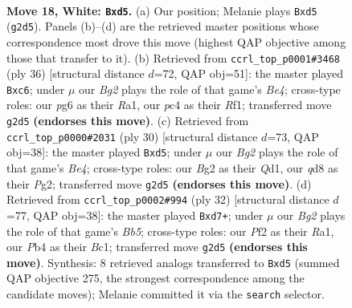 \documentclass[11pt]{article}
\begin{document}
\clearpage

\begin{figure}[p]\centering
\begin{subfigure}{0.46\textwidth}\centering
\resizebox{\linewidth}{!}{%
\newchessgame
\chessboard[
  setfen={rn1qk1r1/p3bp2/b5p1/3n2N1/1Pp5/6P1/P2BPPB1/R2Q1RK1 w q - 0 18},
  showmover=false,
  pgfstyle=straightmove, color=movearrow, markmove={g2-d5}
]}
\caption{}
\end{subfigure}\hfill
\begin{subfigure}{0.46\textwidth}\centering
\resizebox{\linewidth}{!}{%
\newchessgame
\chessboard[
  setfen={r6r/3nqkpp/2p1b3/ppb1p3/4B3/P7/1BQ1NPPP/R4RK1 w - - 1 19},
  showmover=false,
  pgfstyle=straightmove, color=movearrow, markmove={e4-c6}
]}
\caption{}
\end{subfigure}
\\[4pt]
\begin{subfigure}{0.46\textwidth}\centering
\resizebox{\linewidth}{!}{%
\newchessgame
\chessboard[
  setfen={r2qk2r/1p2bppp/p1n5/3n3b/4B3/5N1P/PP3PP1/R1BQ1RK1 w kq - 0 16},
  showmover=false,
  pgfstyle=straightmove, color=movearrow, markmove={e4-d5}
]}
\caption{}
\end{subfigure}\hfill
\begin{subfigure}{0.46\textwidth}\centering
\resizebox{\linewidth}{!}{%
\newchessgame
\chessboard[
  setfen={1r1qkb1r/1b1n1ppp/p3p3/1B6/N7/pP2P3/5PPP/R1BQ1RK1 w k - 0 17},
  showmover=false,
  pgfstyle=straightmove, color=movearrow, markmove={b5-d7}
]}
\caption{}
\end{subfigure}
\caption{\textbf{Move 18, White: \texttt{Bxd5}.} (a) Our position; Melanie plays \texttt{Bxd5} (\texttt{g2d5}). Panels (b)--(d) are the retrieved master positions whose correspondence most drove this move (highest QAP objective among those that transfer to it). (b) Retrieved from \texttt{ccrl\_top\_p0001\#3468} (ply 36) [structural distance $d$=72, QAP obj=51]: the master played \texttt{Bxc6}; under $\mu$ our \emph{Bg2} plays the role of that game's \emph{Be4}; cross-type roles: our \emph{p}g6 as their \emph{R}a1, our \emph{p}c4 as their \emph{R}f1; transferred move \texttt{g2d5} \textbf{(endorses this move)}. (c) Retrieved from \texttt{ccrl\_top\_p0000\#2031} (ply 30) [structural distance $d$=73, QAP obj=38]: the master played \texttt{Bxd5}; under $\mu$ our \emph{Bg2} plays the role of that game's \emph{Be4}; cross-type roles: our \emph{B}g2 as their \emph{Q}d1, our \emph{q}d8 as their \emph{P}g2; transferred move \texttt{g2d5} \textbf{(endorses this move)}. (d) Retrieved from \texttt{ccrl\_top\_p0002\#994} (ply 32) [structural distance $d$=77, QAP obj=38]: the master played \texttt{Bxd7+}; under $\mu$ our \emph{Bg2} plays the role of that game's \emph{Bb5}; cross-type roles: our \emph{P}f2 as their \emph{R}a1, our \emph{P}b4 as their \emph{B}c1; transferred move \texttt{g2d5} \textbf{(endorses this move)}. Synthesis: 8 retrieved analogs transferred to \texttt{Bxd5} (summed QAP objective 275, the strongest correspondence among the candidate moves); Melanie committed it via the \texttt{search} selector.}
\label{fig:thought-m34}
\end{figure}
\end{document}
